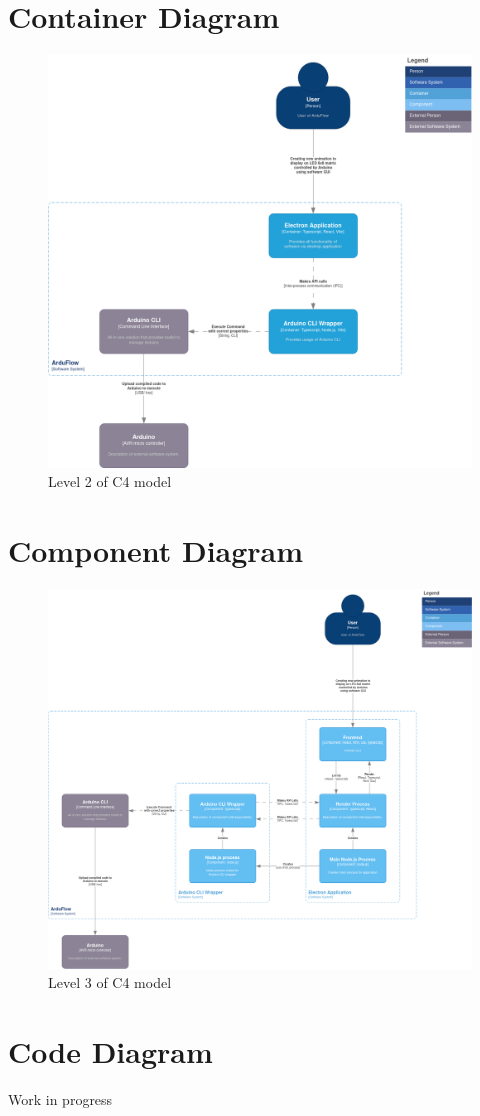 \documentclass[a4paper, 11pt]{article}
\begin{document}
\section{Container Diagram}
\begin{figure}[H]
    \includegraphics[width=\linewidth]{C4model/ArduFlow c4-2.png}
    \caption{Level 2 of C4 model}
    \label{fig:Level 2 of C4 model}
\end{figure}


\section{Component Diagram}
\begin{figure}[H]
    \includegraphics[width=\linewidth]{C4model/ArduFlow c4-3.png}
    \caption{Level 3 of C4 model}
    \label{fig:Level 3 of C4 model}
\end{figure}

\section{Code Diagram}

Work in progress




\pagebreak
\end{document}

